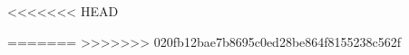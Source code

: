 \documentclass[a4paper]{report}
\begin{document}


\tableofcontents








<<<<<<< HEAD




=======
>>>>>>> 020fb12bae7b8695c0ed28be864f8155238c562f







 
\end{document}
